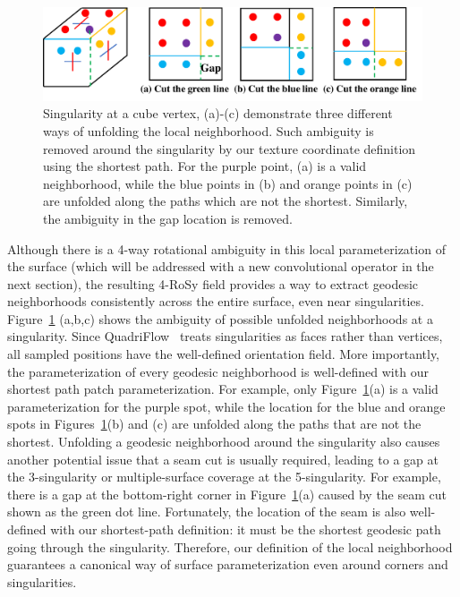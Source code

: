 \begin{figure}
    \centering
    \includegraphics[width=\linewidth]{texturenet/diagram/wrap.pdf}
    \caption{Singularity at a cube vertex, (a)-(c) demonstrate three different ways of unfolding the local neighborhood. Such ambiguity is removed around the singularity by our texture coordinate definition using the shortest path. For the purple point, (a) is a valid neighborhood, while the blue points in (b) and orange points in (c) are unfolded along the paths which are not the shortest. Similarly, the ambiguity in the gap location is removed.}
    \label{fig:texturenet-wrap}
\end{figure}


Although there is a 4-way rotational ambiguity in this local parameterization of the surface (which will be addressed with a new convolutional operator in the next section), the resulting 4-RoSy field provides a way to extract geodesic neighborhoods consistently across the entire surface, even near singularities. 
Figure~\ref{fig:texturenet-wrap} (a,b,c) shows the ambiguity of possible unfolded neighborhoods at a singularity.  Since QuadriFlow~\cite{huang2018quadriflow} treats singularities as faces rather than vertices, all sampled positions have the well-defined orientation field. More importantly, the parameterization of every geodesic neighborhood is well-defined with our shortest path patch parameterization. For example, only Figure~\ref{fig:texturenet-wrap}(a) is a valid parameterization for the purple spot, while the location for the blue and orange spots in Figures~\ref{fig:texturenet-wrap}(b) and (c) are unfolded along the paths that are not the shortest. Unfolding a geodesic neighborhood around the singularity also causes another potential issue that a seam cut is usually required, leading to a gap at the 3-singularity or multiple-surface coverage at the 5-singularity. For example, there is a gap at the bottom-right corner in Figure~\ref{fig:texturenet-wrap}(a) caused by the seam cut shown as the green dot line. Fortunately, the location of the seam is also well-defined with our shortest-path definition: it must be the shortest geodesic path going through the singularity. Therefore, our definition of the local neighborhood guarantees a canonical way of surface parameterization even around corners and singularities.


